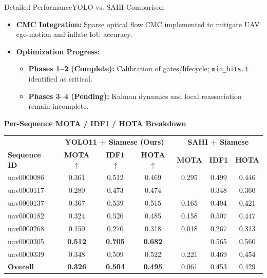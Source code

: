 \documentclass[10pt]{beamer}
\begin{document}
\begin{frame}{Detailed Performance}{YOLO vs. SAHI Comparison}
    \centering

    \begin{itemize}
        \item \textbf{CMC Integration:} Sparse optical flow CMC implemented to mitigate UAV ego-motion and inflate IoU accuracy.
        \item \textbf{Optimization Progress:} 
        \begin{itemize}
            \item \textbf{Phases 1--2 (Complete):} Calibration of gates/lifecycle; \texttt{min\_hits=1} identified as critical.
            \item \textbf{Phases 3--4 (Pending):} Kalman dynamics and local reassociation remain incomplete.
        \end{itemize}
    \end{itemize}
    \small \textbf{Per-Sequence MOTA / IDF1 / HOTA Breakdown}
    \vspace{0.1cm}

    \begin{table}
        \renewcommand{\arraystretch}{1.1}
        \fontsize{7.5pt}{8.5pt}\selectfont
        \centering
        \begin{tabular}{l | ccc | ccc}
            \toprule
            & \multicolumn{3}{c|}{\textbf{YOLO11 + Siamese (Ours)}} & \multicolumn{3}{c}{\textbf{SAHI + Siamese}} \\
            \textbf{Sequence ID} & \textbf{MOTA} $\uparrow$ & \textbf{IDF1} $\uparrow$ & \textbf{HOTA} $\uparrow$ & \textbf{MOTA} & \textbf{IDF1} & \textbf{HOTA} \\
            \midrule
            uav0000086 & 0.361 & 0.512 & 0.469 & 0.295 & 0.499 & 0.446 \\
            uav0000117 & 0.280 & 0.473 & 0.474 & \color{red}{-0.532} & 0.348 & 0.360 \\
            uav0000137 & 0.367 & 0.539 & 0.515 & 0.165 & 0.494 & 0.421 \\
            uav0000182 & 0.324 & 0.526 & 0.485 & 0.158 & 0.507 & 0.447 \\
            uav0000268 & 0.150 & 0.270 & 0.318 & 0.018 & 0.267 & 0.313 \\
            uav0000305 & \textbf{0.512} & \textbf{0.705} & \textbf{0.682} & \color{red}{-0.056} & 0.565 & 0.560 \\
            uav0000339 & 0.348 & 0.509 & 0.522 & 0.221 & 0.469 & 0.454 \\
            \midrule
            \textbf{Overall} & \textbf{0.326} & \textbf{0.504} & \textbf{0.495} & 0.061 & 0.453 & 0.429 \\
            \bottomrule
        \end{tabular}
    \end{table}

    \vspace{0.2cm}

\end{frame}
\end{document}
